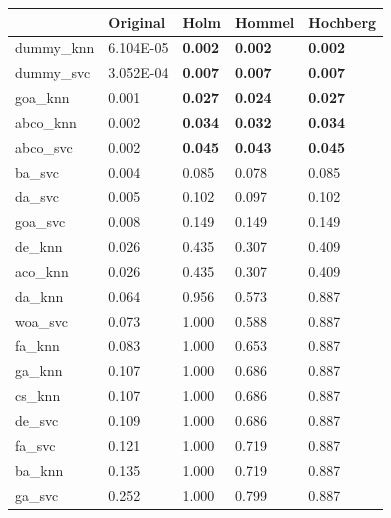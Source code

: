 \begin{table}[htb]
    \centering
    \begin{tabular}{lllll}
        \toprule
        {}         & Original  & Holm           & Hommel         & Hochberg       \\
        \midrule
        dummy\_knn & 6.104E-05 & \textbf{0.002} & \textbf{0.002} & \textbf{0.002} \\
        dummy\_svc & 3.052E-04 & \textbf{0.007} & \textbf{0.007} & \textbf{0.007} \\
        goa\_knn   & 0.001     & \textbf{0.027} & \textbf{0.024} & \textbf{0.027} \\
        abco\_knn  & 0.002     & \textbf{0.034} & \textbf{0.032} & \textbf{0.034} \\
        abco\_svc  & 0.002     & \textbf{0.045} & \textbf{0.043} & \textbf{0.045} \\
        ba\_svc    & 0.004     & 0.085          & 0.078          & 0.085          \\
        da\_svc    & 0.005     & 0.102          & 0.097          & 0.102          \\
        goa\_svc   & 0.008     & 0.149          & 0.149          & 0.149          \\
        de\_knn    & 0.026     & 0.435          & 0.307          & 0.409          \\
        aco\_knn   & 0.026     & 0.435          & 0.307          & 0.409          \\
        da\_knn    & 0.064     & 0.956          & 0.573          & 0.887          \\
        woa\_svc   & 0.073     & 1.000          & 0.588          & 0.887          \\
        fa\_knn    & 0.083     & 1.000          & 0.653          & 0.887          \\
        ga\_knn    & 0.107     & 1.000          & 0.686          & 0.887          \\
        cs\_knn    & 0.107     & 1.000          & 0.686          & 0.887          \\
        de\_svc    & 0.109     & 1.000          & 0.686          & 0.887          \\
        fa\_svc    & 0.121     & 1.000          & 0.719          & 0.887          \\
        ba\_knn    & 0.135     & 1.000          & 0.719          & 0.887          \\
        ga\_svc    & 0.252     & 1.000          & 0.799          & 0.887          \\

\end{tabular}
\end{table}
